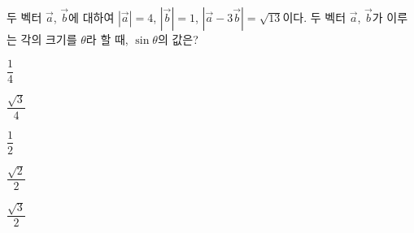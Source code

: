 두 벡터 $\vec{a}$, $\vec{b}$에 대하여 $|\vec{a}|=4$, $|\vec{b}|=1$, $|\vec{a}-3\vec{b}|=\sqrt{13}$이다. 두 벡터 $\vec{a}$, $\vec{b}$가 이루는 각의 크기를 $\theta$라 할 때, $\sin\theta$의 값은?
\begin{choices32}{\rule[-3ex]{0pt}{8ex}$\dfrac{1}{4}$}{\rule[-3ex]{0pt}{8ex}$\dfrac{\sqrt{3}}{4}$}{\rule[-3ex]{0pt}{8ex}$\dfrac{1}{2}$}{\rule[-3ex]{0pt}{8ex}$\dfrac{\sqrt{2}}{2}$}{\rule[-3ex]{0pt}{8ex}$\dfrac{\sqrt{3}}{2}$}\end{choices32}
